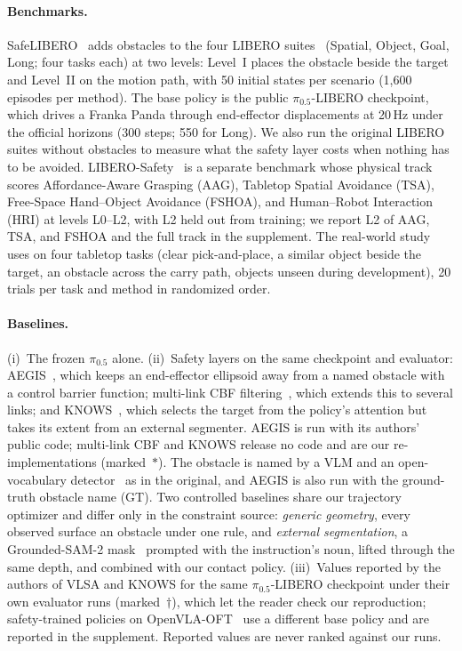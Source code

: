 \paragraph{Benchmarks.}
SafeLIBERO~\cite{hu2026vlsa} adds obstacles to the four LIBERO suites~\cite{liu2023libero} (Spatial, Object, Goal, Long; four tasks each) at two levels: Level~I places the obstacle beside the target and Level~II on the motion path, with 50 initial states per scenario (1,600 episodes per method). The base policy is the public $\pi_{0.5}$-LIBERO checkpoint, which drives a Franka Panda through end-effector displacements at 20\,Hz under the official horizons (300 steps; 550 for Long). We also run the original LIBERO suites without obstacles to measure what the safety layer costs when nothing has to be avoided. LIBERO-Safety~\cite{cui2026liberosafety} is a separate benchmark whose physical track scores Affordance-Aware Grasping (AAG), Tabletop Spatial Avoidance (TSA), Free-Space Hand--Object Avoidance (FSHOA), and Human--Robot Interaction (HRI) at levels L0--L2, with L2 held out from training; we report L2 of AAG, TSA, and FSHOA and the full track in the supplement. The real-world study uses  on four tabletop tasks (clear pick-and-place, a similar object beside the target, an obstacle across the carry path, objects unseen during development), 20 trials per task and method in randomized order.

\paragraph{Baselines.}
(i)~The frozen $\pi_{0.5}$ alone. (ii)~Safety layers on the same checkpoint and evaluator: AEGIS~\cite{hu2026vlsa}, which keeps an end-effector ellipsoid away from a named obstacle with a control barrier function; multi-link CBF filtering~\cite{agarwal2026multilink}, which extends this to several links; and KNOWS~\cite{park2026knows}, which selects the target from the policy's attention but takes its extent from an external segmenter. AEGIS is run with its authors' public code; multi-link CBF and KNOWS release no code and are our re-implementations (marked~$\ast$). The obstacle is named by a VLM and an open-vocabulary detector~\cite{liu2024groundingdino} as in the original, and AEGIS is also run with the ground-truth obstacle name (GT). Two controlled baselines share our trajectory optimizer and differ only in the constraint source: \emph{generic geometry}, every observed surface an obstacle under one rule, and \emph{external segmentation}, a Grounded-SAM-2 mask~\cite{liu2024groundingdino,ravi2024sam2} prompted with the instruction's noun, lifted through the same depth, and combined with our contact policy. (iii)~Values reported by the authors of VLSA and KNOWS for the same $\pi_{0.5}$-LIBERO checkpoint under their own evaluator runs (marked~$\dagger$), which let the reader check our reproduction; safety-trained policies on OpenVLA-OFT~\cite{kim2025openvlaoft,zhang2025safevla,zhu2026wmpo,tang2026safedojo} use a different base policy and are reported in the supplement. Reported values are never ranked against our runs.

